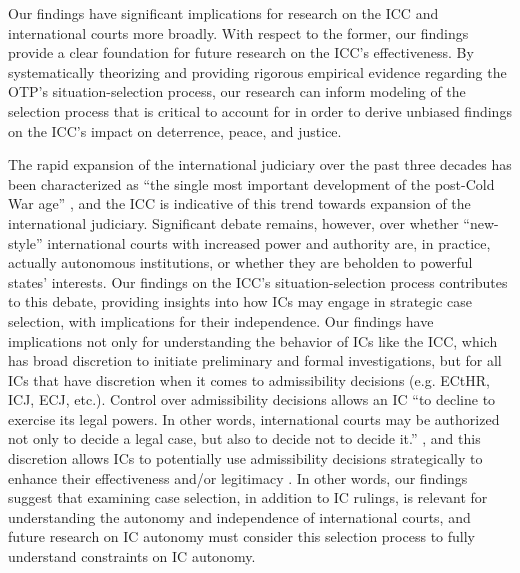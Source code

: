 Our findings have significant implications for research on the ICC and international courts more broadly. With respect to the former, our findings provide a clear foundation for future research on the ICC's effectiveness. By systematically theorizing and providing rigorous empirical evidence regarding the OTP's situation-selection process, our research can inform modeling of the selection process that is critical to account for in order to derive unbiased findings on the ICC's impact on deterrence, peace, and justice.   

The rapid expansion of the international judiciary over the past three decades has been characterized as ``the single most important development of the post-Cold War age'' \citep[709]{romano1998proliferation}, and the ICC is indicative of this trend towards expansion of the international judiciary. Significant debate remains, however, over whether ``new-style'' international courts with increased power and authority are, in practice, actually autonomous institutions, or whether they are beholden to powerful states' interests. Our findings on the ICC's situation-selection process contributes to this debate, providing insights into how ICs may engage in strategic case selection, with implications for their independence. Our findings have implications not only for understanding the behavior of ICs like the ICC, which has broad discretion to initiate preliminary and formal investigations, but for all ICs that have discretion when it comes to admissibility decisions (e.g. ECtHR, ICJ, ECJ, etc.). Control over admissibility decisions allows an IC ``to decline to exercise its legal powers. In other words, international courts may be authorized not only to decide a legal case, but also to decide not to decide it.'' \citep[47]{shany2016questions}, and this discretion allows ICs to potentially use admissibility decisions strategically to enhance their effectiveness and/or legitimacy \citep[53]{shany2016questions}. In other words, our findings suggest that examining case selection, in addition to IC rulings, is relevant for understanding the autonomy and independence of international courts, and future research on IC autonomy must consider this selection process to fully understand constraints on IC autonomy. 

